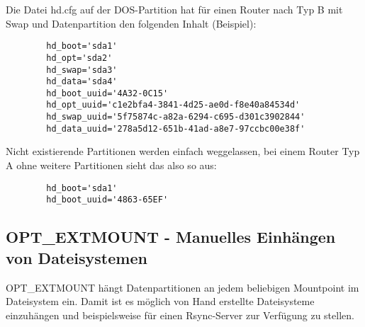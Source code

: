     
    Die Datei hd.cfg auf der DOS-Partition hat für einen Router nach Typ B mit Swap und 
    Datenpartition den folgenden Inhalt (Beispiel):
    \begin{verbatim}
        hd_boot='sda1'
        hd_opt='sda2'
        hd_swap='sda3'
        hd_data='sda4'
        hd_boot_uuid='4A32-0C15'
        hd_opt_uuid='c1e2bfa4-3841-4d25-ae0d-f8e40a84534d'
        hd_swap_uuid='5f75874c-a82a-6294-c695-d301c3902844'
        hd_data_uuid='278a5d12-651b-41ad-a8e7-97ccbc00e38f'
    \end{verbatim}
    
    Nicht existierende Partitionen werden einfach weggelassen, bei einem Router Typ A 
    ohne weitere Partitionen sieht das also so aus:
    \begin{verbatim}
        hd_boot='sda1'
        hd_boot_uuid='4863-65EF'
     \end{verbatim}

\subsection {OPT\_EXTMOUNT - Manuelles Einhängen von Dateisystemen}

    OPT\_EXTMOUNT hängt Datenpartitionen an jedem beliebigen Mountpoint
    im Dateisystem ein. Damit ist es möglich von Hand erstellte Dateisysteme einzuhängen
    und beispielsweise für einen Rsync-Server zur Verfügung zu stellen.

